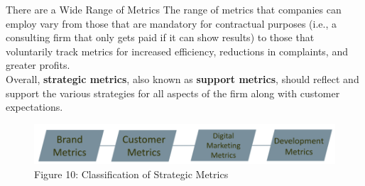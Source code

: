 \documentclass[pdf]{beamer}
\newcommand{\empr}[1]{{\color{franklinblue}\textbf{#1}}}
\theoremstyle{remark}
\theoremstyle{definition}
\begin{document}
\begin{frame}[t]{There are a Wide Range of Metrics}
The range of metrics that companies can employ vary from those that are mandatory for contractual purposes (i.e., a consulting firm that only gets paid if it can show results) to those that voluntarily track metrics for increased efficiency, reductions in complaints, and greater profits. \\
\vspace{1.5ex}
Overall, \empr{strategic metrics}, also known as \empr{support metrics}, should reflect and support the various strategies for all aspects of the firm along with customer expectations.\\
\vspace{1.5ex}
\begin{figure}[htbp]
    \centering
    \captionsetup{justification=centering}
    \includegraphics[clip, trim=0.0cm 0.0cm 0.0cm 0.0cm, width=1\textwidth]{Images/Picture3.png}  
    \caption{Figure {\color{franklinblue} 10}:  Classification of Strategic Metrics}
    \label{fig:campstrag}
\end{figure} 
\end{frame}
\end{document}
